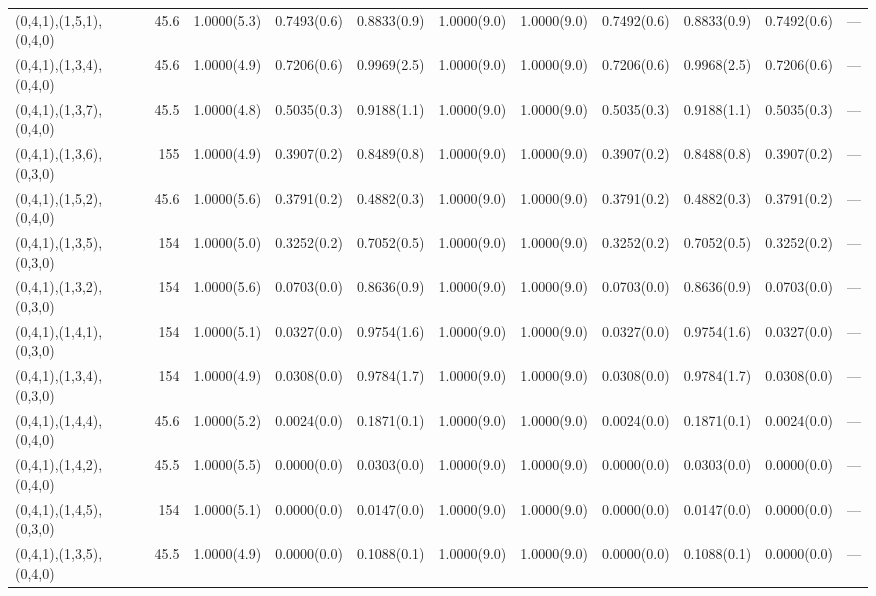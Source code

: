 \begin{tabular}{lrlllllllll}
 (0,4,1),(1,5,1),(0,4,0)    &   45.6 & 1.0000(5.3)  & 0.7493(0.6)  & 0.8833(0.9)  & 1.0000(9.0)    & 1.0000(9.0)  & 0.7492(0.6)    & 0.8833(0.9)  & 0.7492(0.6)  & ---    \\
 (0,4,1),(1,3,4),(0,4,0)    &   45.6 & 1.0000(4.9)  & 0.7206(0.6)  & 0.9969(2.5)  & 1.0000(9.0)    & 1.0000(9.0)  & 0.7206(0.6)    & 0.9968(2.5)  & 0.7206(0.6)  & ---    \\
 (0,4,1),(1,3,7),(0,4,0)    &   45.5 & 1.0000(4.8)  & 0.5035(0.3)  & 0.9188(1.1)  & 1.0000(9.0)    & 1.0000(9.0)  & 0.5035(0.3)    & 0.9188(1.1)  & 0.5035(0.3)  & ---    \\
 (0,4,1),(1,3,6),(0,3,0)    &  155   & 1.0000(4.9)  & 0.3907(0.2)  & 0.8489(0.8)  & 1.0000(9.0)    & 1.0000(9.0)  & 0.3907(0.2)    & 0.8488(0.8)  & 0.3907(0.2)  & ---    \\
 (0,4,1),(1,5,2),(0,4,0)    &   45.6 & 1.0000(5.6)  & 0.3791(0.2)  & 0.4882(0.3)  & 1.0000(9.0)    & 1.0000(9.0)  & 0.3791(0.2)    & 0.4882(0.3)  & 0.3791(0.2)  & ---    \\
 (0,4,1),(1,3,5),(0,3,0)    &  154   & 1.0000(5.0)  & 0.3252(0.2)  & 0.7052(0.5)  & 1.0000(9.0)    & 1.0000(9.0)  & 0.3252(0.2)    & 0.7052(0.5)  & 0.3252(0.2)  & ---    \\
 (0,4,1),(1,3,2),(0,3,0)    &  154   & 1.0000(5.6)  & 0.0703(0.0)  & 0.8636(0.9)  & 1.0000(9.0)    & 1.0000(9.0)  & 0.0703(0.0)    & 0.8636(0.9)  & 0.0703(0.0)  & ---    \\
 (0,4,1),(1,4,1),(0,3,0)    &  154   & 1.0000(5.1)  & 0.0327(0.0)  & 0.9754(1.6)  & 1.0000(9.0)    & 1.0000(9.0)  & 0.0327(0.0)    & 0.9754(1.6)  & 0.0327(0.0)  & ---    \\
 (0,4,1),(1,3,4),(0,3,0)    &  154   & 1.0000(4.9)  & 0.0308(0.0)  & 0.9784(1.7)  & 1.0000(9.0)    & 1.0000(9.0)  & 0.0308(0.0)    & 0.9784(1.7)  & 0.0308(0.0)  & ---    \\
 (0,4,1),(1,4,4),(0,4,0)    &   45.6 & 1.0000(5.2)  & 0.0024(0.0)  & 0.1871(0.1)  & 1.0000(9.0)    & 1.0000(9.0)  & 0.0024(0.0)    & 0.1871(0.1)  & 0.0024(0.0)  & ---    \\
 (0,4,1),(1,4,2),(0,4,0)    &   45.5 & 1.0000(5.5)  & 0.0000(0.0)  & 0.0303(0.0)  & 1.0000(9.0)    & 1.0000(9.0)  & 0.0000(0.0)    & 0.0303(0.0)  & 0.0000(0.0)  & ---    \\
 (0,4,1),(1,4,5),(0,3,0)    &  154   & 1.0000(5.1)  & 0.0000(0.0)  & 0.0147(0.0)  & 1.0000(9.0)    & 1.0000(9.0)  & 0.0000(0.0)    & 0.0147(0.0)  & 0.0000(0.0)  & ---    \\
 (0,4,1),(1,3,5),(0,4,0)    &   45.5 & 1.0000(4.9)  & 0.0000(0.0)  & 0.1088(0.1)  & 1.0000(9.0)    & 1.0000(9.0)  & 0.0000(0.0)    & 0.1088(0.1)  & 0.0000(0.0)  & ---    \\

\end{tabular}
